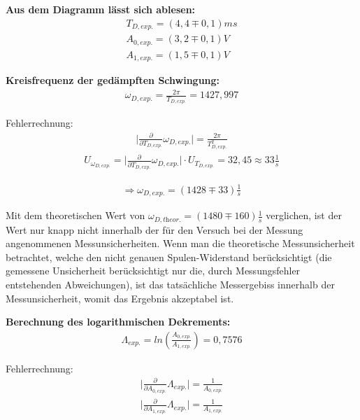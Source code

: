\documentclass[a4paper]{scrartcl}
\numberwithin{equation}{subsection}
\begin{document}
\textbf{Aus dem Diagramm lässt sich ablesen:}
\begin{align*}
T_{D,\textit{exp.}} = (4,4\mp0,1)ms \\
A_{0,\textit{exp.}} = (3,2\mp0,1)V \\
A_{1,\textit{exp.}} = (1,5\mp0,1)V
\end{align*}

\textbf{Kreisfrequenz der gedämpften Schwingung:}
\begin{align}
\omega_{D,\textit{exp.}} = \frac{2\pi}{T_{D,\textit{exp.}}} = 1427,997
\end{align}

Fehlerrechnung:
\begin{align*}
\vert \frac{\partial}{\partial T_{D,\textit{exp.}}}\omega_{D,\textit{exp.}}\vert = \frac{2\pi}{T_{D,\textit{exp.}}^2}
\end{align*}
\begin{align*}
U_{\omega_{D,\textit{exp.}}} = \vert \frac{\partial}{\partial T_{D,\textit{exp.}}}\omega_{D,\textit{exp.}}\vert \cdot U_{T_{D,\textit{exp.}}} = 32,45 \approx 33 \frac{1}{s} 
\end{align*}

\begin{align*}
\Rightarrow \omega_{D,\textit{exp.}} = (1428 \mp 33) \frac{1}{s}
\end{align*}

Mit dem theoretischen Wert von $\omega_{D,\textit{theor.}} = (1480\mp160) \frac{1}{s}$ verglichen, ist der Wert nur knapp nicht innerhalb der für den Versuch bei der Messung angenommenen Messunsicherheiten. Wenn man die theoretische Messunsicherheit betrachtet, welche den nicht genauen Spulen-Widerstand berücksichtigt (die gemessene Unsicherheit berücksichtigt nur die, durch Messungsfehler entstehenden Abweichungen), ist das tatsächliche Messergebiss innerhalb der Messunsicherheit, womit das Ergebnis akzeptabel ist.

\textbf{Berechnung des logarithmischen Dekrements:}
\begin{align}
\Lambda_{\textit{exp.}} = ln(\frac{A_{0,\textit{exp.}}}{A_{1,\textit{exp.}}}) = 0,7576
\end{align}

Fehlerrechnung:
\begin{align*}
\vert \frac{\partial}{\partial A_{0,\textit{exp.}}}\Lambda_{\textit{exp.}}\vert = \frac{1}{A_{0,\textit{exp.}}} \\
\vert \frac{\partial}{\partial A_{1,\textit{exp.}}}\Lambda_{\textit{exp.}}\vert = \frac{1}{A_{1,\textit{exp.}}}
\end{align*}
\end{document}
